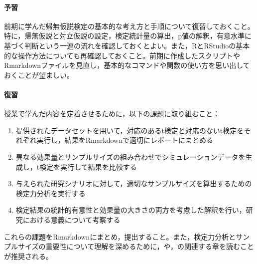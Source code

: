 \paragraph{予習}
前期に学んだ帰無仮説検定の基本的な考え方と手順について復習しておくこと。特に，帰無仮説と対立仮説の設定，検定統計量の算出，p値の解釈，有意水準に基づく判断という一連の流れを確認しておくとよい。また，RとRStudioの基本的な操作方法についても再確認しておくこと。前期に作成したスクリプトやRmarkdownファイルを見直し，基本的なコマンドや関数の使い方を思い出しておくことが望ましい。

\paragraph{復習}
授業で学んだ内容を定着させるために，以下の課題に取り組むこと：

\begin{enumerate}
\item 提供されたデータセットを用いて，対応のあるt検定と対応のないt検定をそれぞれ実行し，結果をRmarkdownで適切にレポートにまとめる
\item 異なる効果量とサンプルサイズの組み合わせでシミュレーションデータを生成し，t検定を実行して結果を比較する
\item 与えられた研究シナリオに対して，適切なサンプルサイズを算出するための検定力分析を実行する
\item 検定結果の統計的有意性と効果量の大きさの両方を考慮した解釈を行い，研究における意義について考察する
\end{enumerate}

これらの課題をRmarkdownにまとめ，提出すること。また，検定力分析とサンプルサイズの重要性について理解を深めるために，\textcite{Matia201201}や\textcite{Kawabata201408}，\textcite{kosugi2023}の関連する章を読むことが推奨される。